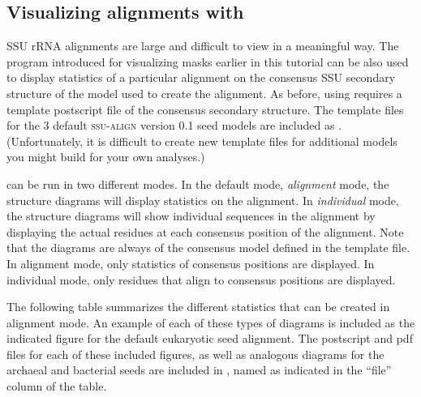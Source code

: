 \subsection{Visualizing alignments with }

SSU rRNA alignments are large and difficult to view in a meaningful
way. The  program introduced for visualizing masks
earlier in this tutorial can be also used to display statistics of
a particular alignment on the consensus SSU secondary structure of the
model used to create the alignment. As before,
using  requires a template postscript file of the
consensus secondary structure. The template files for the 3 default
\textsc{ssu-align} version 0.1 seed models are included as
. 
(Unfortunately, it is difficult to create new template files for
additional models you might build for your own analyses.) 

 can be run in two different modes. In the default
mode, \emph{alignment} mode, the structure diagrams will display
statistics on the alignment. In \emph{individual} mode, the structure
diagrams will show individual sequences in the alignment by displaying
the actual residues at each consensus position of the alignment. Note
that the diagrams are always of the consensus model defined in the
template file. In alignment mode, only statistics of consensus
positions are displayed. In individual mode, only residues that align to
consensus positions are displayed.

The following table summarizes the different statistics that can be
created in alignment mode.
An example of each of these types of
diagrams is included as the indicated figure for the default
eukaryotic seed alignment. The postscript and pdf files for each of
these included figures, as well as analogous diagrams for the
archaeal and bacterial seeds are included in 
, named as indicated 
in the ``file'' column of the table. 

